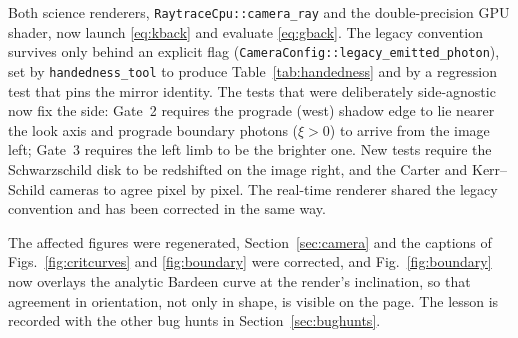 Both science renderers, \texttt{RaytraceCpu::camera\_ray} and the
double-precision GPU shader, now launch \eqref{eq:kback} and evaluate
\eqref{eq:gback}. The legacy convention survives only behind an
explicit flag (\texttt{CameraConfig::legacy\_emitted\_photon}), set by
\texttt{handedness\_tool} to produce Table~\ref{tab:handedness} and by
a regression test that pins the mirror identity. The tests that were
deliberately side-agnostic now fix the side: Gate~2 requires the
prograde (west) shadow edge to lie nearer the look axis and prograde
boundary photons ($\xi > 0$) to arrive from the image left; Gate~3
requires the left limb to be the brighter one. New tests require the
Schwarzschild disk to be redshifted on the image right, and the Carter
and Kerr--Schild cameras to agree pixel by pixel. The real-time renderer
shared the legacy convention and has been corrected in the same way.

The affected figures were regenerated, Section~\ref{sec:camera} and
the captions of Figs.~\ref{fig:critcurves} and \ref{fig:boundary} were
corrected, and Fig.~\ref{fig:boundary} now overlays the analytic
Bardeen curve at the render's inclination, so that agreement in
orientation, not only in shape, is visible on the page. The lesson is
recorded with the other bug hunts in Section~\ref{sec:bughunts}.
